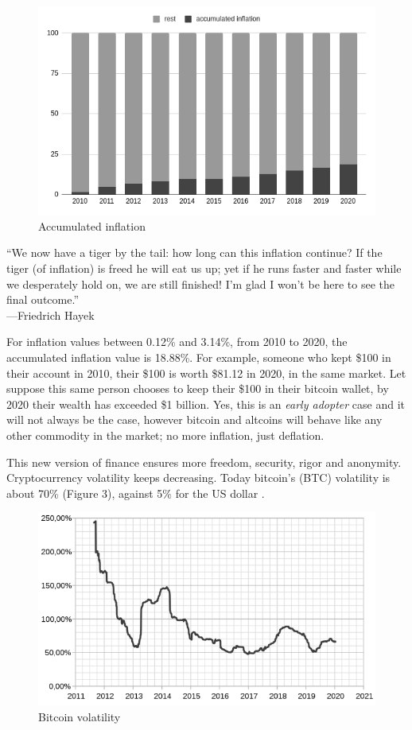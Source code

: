 \documentclass[12pt]{article}
\begin{document}
\begin{figure}[!h]
  \centering
  \includegraphics[width=.8\linewidth]{figure2}
  \caption{Accumulated inflation}
  \label{fig:f2}
\end{figure}

“We now have a tiger by the tail: how long can this inflation continue? If the tiger (of inflation) is freed he will eat us up; yet if he runs faster and faster while we desperately hold on, we are still finished! I'm glad I won't be here to see the final outcome.”\\
—Friedrich Hayek \cite{hayek1971tiger}\\
{}

For inflation values between 0.12\% and 3.14\%, from 2010 to 2020, the accumulated inflation value is 18.88\%. For example, someone who kept \$100 in their account in 2010, their \$100 is worth \$81.12 in 2020, in the same market. Let suppose this same person chooses to keep their \$100 in their bitcoin wallet, by 2020 their wealth has exceeded \$1 billion. Yes, this is an \emph{early adopter} case and it will not always be the case, however bitcoin and altcoins will behave like any other commodity in the market; no more inflation, just deflation.

This new version of finance ensures more freedom, security, rigor and anonymity. Cryptocurrency volatility keeps decreasing. Today bitcoin's (BTC) volatility is about 70\% (Figure 3), against 5\% for the US dollar \cite{usd2020volatility}.
\clearpage
\begin{figure}[!h]
  \centering
  \includegraphics[width=.8\linewidth]{figure31}
  \caption{Bitcoin volatility}
  \label{fig:f2}
\end{figure}
\end{document}
